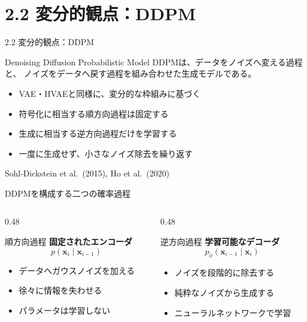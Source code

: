 \section{2.2 変分的観点：DDPM}

\begin{frame}{2.2 変分的観点：DDPM}
    \begin{block}{Denoising Diffusion Probabilistic Model}
        DDPMは、データをノイズへ変える過程と、
        ノイズをデータへ戻す過程を組み合わせた生成モデルである。
    \end{block}
    \begin{itemize}
        \item VAE・HVAEと同様に、変分的な枠組みに基づく
        \item 符号化に相当する順方向過程は固定する
        \item 生成に相当する逆方向過程だけを学習する
        \item 一度に生成せず、小さなノイズ除去を繰り返す
    \end{itemize}
    \vfill
    \footnotesize
    Sohl-Dickstein et al.\ (2015), Ho et al.\ (2020)
\end{frame}
\begin{frame}{DDPMを構成する二つの確率過程}
    \begin{columns}[T,onlytextwidth]
        \begin{column}{0.48\textwidth}
            \begin{block}{順方向過程}
                \centering
                \textbf{固定されたエンコーダ}
                \[
                    p(\boldsymbol{x}_i\mid\boldsymbol{x}_{i-1})
                \]
                \begin{itemize}
                    \item データへガウスノイズを加える
                    \item 徐々に情報を失わせる
                    \item パラメータは学習しない
                \end{itemize}
            \end{block}
        \end{column}
        \begin{column}{0.48\textwidth}
            \begin{exampleblock}{逆方向過程}
                \centering
                \textbf{学習可能なデコーダ}
                \[
                    p_\phi(\boldsymbol{x}_{i-1}\mid\boldsymbol{x}_i)
                \]
                \begin{itemize}
                    \item ノイズを段階的に除去する
                    \item 純粋なノイズから生成する
                    \item ニューラルネットワークで学習
                \end{itemize}
            \end{exampleblock}
        \end{column}
    \end{columns}
\end{frame}
